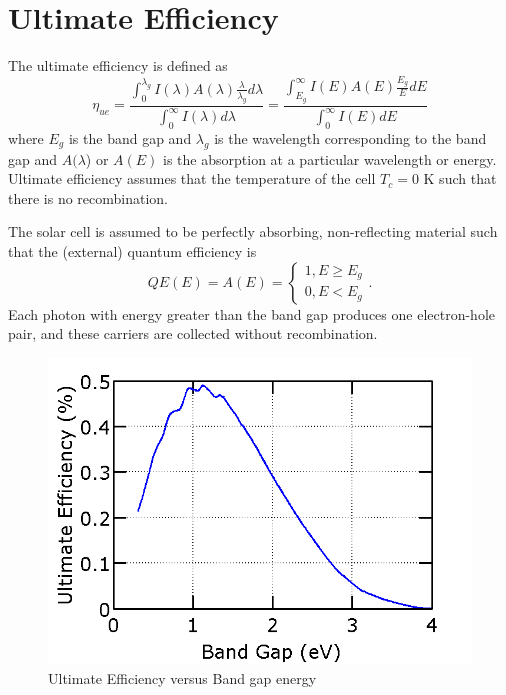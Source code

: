\documentclass[12pt]{article}
\begin{document}
\section{Ultimate Efficiency}

The ultimate efficiency is defined as
\begin{equation}
\boxed{\eta_{ue} = \frac{\int_{0}^{\lambda_g} I(\lambda) A(\lambda) \frac{\lambda}{\lambda_g} d\lambda}{\int_{0}^{\infty} I(\lambda) d\lambda} = \frac{\int_{E_g}^{\infty} I(E) A(E) \frac{E_g}{E} dE}{\int_{0}^{\infty} I(E) dE} }
\end{equation}
where $E_g$ is the band gap and $\lambda_g$ is the wavelength corresponding to the band gap and $A(\lambda$) or $A(E)$ is the absorption at a particular wavelength or energy.  Ultimate efficiency assumes that the temperature of the cell $T_c = 0$ K such that there is no recombination.   

The solar cell is assumed to be perfectly absorbing, non-reflecting material such that the (external) quantum efficiency is
\begin{equation}
QE(E) = A(E) = \begin{cases} 
1, E \geq E_g\\ 
0, E < E_g \end{cases}.
\end{equation}
Each photon with energy greater than the band gap produces one electron-hole pair, and these carriers are collected without recombination.    

\begin{figure}[H]
\centering
 \includegraphics[scale=.4]{Figures/UltimateEfficiencyVersusEnergy}
 \caption{Ultimate Efficiency versus Band gap energy}
  \label{fig:leadingThermoelectrics}
\end{figure}
\end{document}
